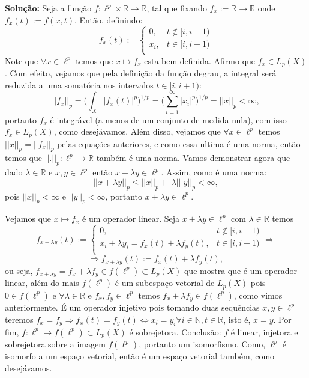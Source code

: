 \documentclass{article}
\begin{document}
\begin{enumerate}
\begin{enumerate}
				\textbf{Solução:} Seja a função $f: \ell^{p} \times \mathbb{R} \to \mathbb{R}$, tal que fixando $f_{x} := \mathbb{R} \to \mathbb{R}$ onde $f_{x}(t) := f(x, t)$. Então, definindo:
				$$
				f_{x}(t) := \left\{
				\begin{array}{cc}
				0, & t \notin [i, i+1)\\
				x_{i}, & t \in [i, i+1) \\
				\end{array}
				\right.
				$$
				Note que $\forall x \in \ell^{p}$ temos que $x \mapsto f_{x}$ esta bem-definida. Afirmo que $f_{x} \in L_{p}(X)$. Com efeito, vejamos que pela definição da função degrau, a integral será reduzida a uma somatória nos intervalos $t \in [i, i+1)$: 
				$$
				||f_{x}||_{p} = \Big(\int_{X}|f_x(t)|^{p}\Big)^{1/p} = \Big(\sum \limits_{i=1}^{\infty}|x_i|^{p}\Big)^{1/p} = ||x||_{p} < \infty, 
				$$
				portanto $f_{x}$ é integrável (a menos de um conjunto de medida nula), com isso $f_{x} \in L_{p}(X)$, como desejávamos. Além disso, vejamos que $\forall x \in \ell^{p}$ temos $||x||_{p} = ||f_{x}||_{p}$ pelas equações anteriores, e como essa ultima é uma norma, então temos que $||.||_{p}: \ell^{p} \to \mathbb{R}$ também é uma norma. Vamos demonstrar agora que dado $\lambda \in \mathbb{R}$ e $x, y \in \ell^{p}$ então $x+\lambda y \in \ell^{p}$. Assim, como é uma norma:
				$$
				||x+\lambda y||_{p} \leq ||x||_{p} + |\lambda |||y||_{p} < \infty,
				$$
				pois $||x||_{p} < \infty$ e $||y||_{p} < \infty$, portanto $x+\lambda y \in \ell^{p}$.
				
				Vejamos que $x \mapsto f_{x}$ é um operador linear. Seja $x + \lambda y \in \ell^{p}$ com $\lambda \in \mathbb{R}$ temos
				$$
				f_{x + \lambda y }(t) := \left\{
				\begin{array}{cc}
				0, & t \notin [i, i+1)\\
				x_{i} +\lambda y_{i} = f_{x}(t) + \lambda f_{y}(t), & t \in [i, i+1) \\
				\end{array}
				\right. \Rightarrow				
				$$
				$$
				\Rightarrow f_{x + \lambda y }(t) := f_{x}(t) + \lambda f_{y}(t),
				$$
				ou seja, $f_{x + \lambda y } = f_{x} + \lambda f_{y } \in f(\ell^{p}) \subset L_{p}(X)$ que mostra que é um operador linear, além do mais $f(\ell^{p})$ é um subespaço vetorial de $L_{p}(X)$ pois $0 \in f(\ell^{p})$ e $\forall \lambda \in \mathbb{R}$ e $f_{x}, f_{y} \in \ell^{p}$ temos $f_{x} + \lambda f_{y } \in f(\ell^{p})$, como vimos anteriormente. É um operador injetivo pois tomando duas sequências $x, y \in \ell^{p}$ teremos $f_{x} = f_{y} \Rightarrow f_{x}(t) = f_{y}(t) \iff x_{i} = y_{i} \forall i \in \mathbb{N}, t \in \mathbb{R}$, isto é, $x=y$. Por fim, $f: \ell^{p} \to f(\ell^{p}) \subset L_{p}(X)$ é sobrejetora. Conclusão: $f$ é linear, injetora e sobrejetora sobre a imagem $f(\ell^{p})$, portanto um isomorfismo. Como, $\ell^{p}$ é isomorfo a um espaço vetorial, então é um espaço vetorial também, como desejávamos.
				

\end{enumerate}
\end{enumerate}
\end{document}
